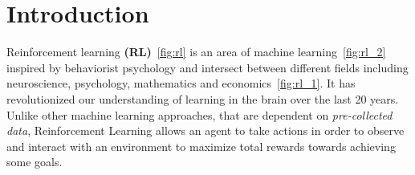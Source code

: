 
\chapter{Introduction}\label{chapter:introduction}

Reinforcement learning \textbf{(RL)}~\ref{fig:rl} is an area of machine learning~\ref{fig:rl_2} inspired by behaviorist psychology and intersect between different fields including neuroscience, psychology, mathematics and economics~\ref{fig:rl_1}. It has revolutionized our understanding of learning in the brain over the last 20 years. Unlike other machine learning approaches, that are dependent on \textit{pre-collected data}, Reinforcement Learning allows an agent to take actions in order to observe and interact with an environment to maximize total rewards towards achieving some goals.

